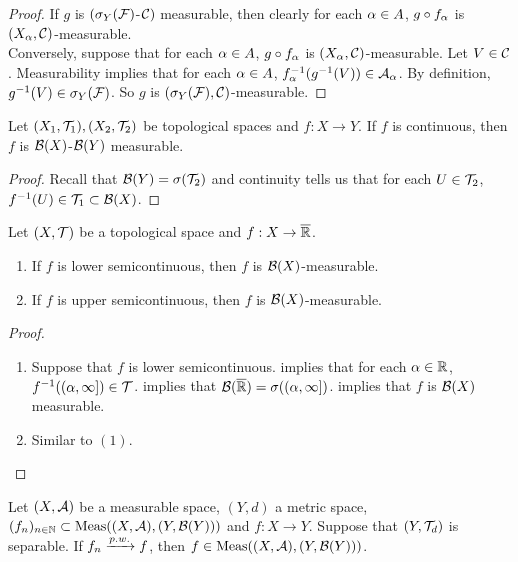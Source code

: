 \documentclass{book}
\begin{document}
	\begin{proof}
		If $g$ is $(\sigma_Y(\mathcal{F})$-$\mathcal{C})$ measurable, then clearly for each $\alpha \in A$, $g \circ f_{\alpha}$ is $(X_{\alpha}, \mathcal{C})$-measurable. \\
		Conversely, suppose that for each $\alpha \in A$, $g \circ f_{\alpha}$ is $(X_{\alpha}, \mathcal{C})$-measurable. Let $V \in \mathcal{C}$. Measurability implies that for each $\alpha \in A$, $f_{\alpha}^{-1}(g^{-1}(V)) \in \mathcal{A}_{\alpha}$. By definition, $g^{-1}(V) \in \sigma_Y(\mathcal{F})$. So $g$ is $(\sigma_Y(\mathcal{F}), \mathcal{C})$-measurable.
	\end{proof}
	
	\begin{ex} 
		Let $(X_1,\mathcal{T}_1), (X_2,\mathcal{T}_2)$ be topological spaces and $f: X \rightarrow Y$. If $f$ is continuous, then $f$ is $\mathcal{B}(X)$-$\mathcal{B}(Y)$ measurable.
	\end{ex}
	
	\begin{proof}
		Recall that $\mathcal{B}(Y) = \sigma(\mathcal{T}_2)$ and continuity tells us that for each $U \in \mathcal{T}_2$, $f^{-1}(U) \in \mathcal{T}_1 \subset \mathcal{B}(X)$. 
	\end{proof}

	\begin{ex} 
		Let $(X, \mathcal{T})$ be a topological space and $f:X \rightarrow \overline{\mathbb{R}}$. 
		\begin{enumerate}
			\item If $f$ is lower semicontinuous, then $f$ is $\mathcal{B}(X)$-measurable.
			\item If $f$ is upper semicontinuous, then $f$ is $\mathcal{B}(X)$-measurable.
		\end{enumerate}
	\end{ex}

	\begin{proof}\
		\begin{enumerate}
			\item Suppose that $f$ is lower semicontinuous.  implies that for each $\alpha \in \mathbb{R}$, $f^{-1}((\alpha, \infty]) \in \mathcal{T}$.   implies that $\mathcal{B}(\overline{\mathbb{R}}) = \sigma((\alpha, \infty])$.  implies that $f$ is $\mathcal{B}(X)$ measurable.
			\item Similar to $(1)$.
		\end{enumerate}
	\end{proof}

	\begin{ex} 
		Let $(X, \mathcal{A})$ be a measurable space, $(Y, d)$ a metric space, $(f_n)_{n \in \mathbb{N}} \subset \operatorname{\text{Meas}}((X, \mathcal{A}), (Y, \mathcal{B}(Y)))$ and $f:X \rightarrow Y$. Suppose that $(Y, \mathcal{T}_d)$ is separable. If $f_n \xrightarrow{p.w.} f$, then $f \in \operatorname{\text{Meas}}((X, \mathcal{A}), (Y, \mathcal{B}(Y)))$.
	\end{ex}
\end{document}
